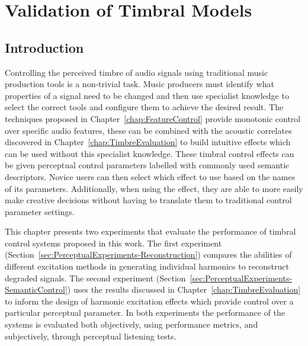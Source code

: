 \chapter{Validation of Timbral Models}
\label{chap:PerceptualExperiments}

\section{Introduction}
\label{sec:PerceptualExperiments-Introduction}
	Controlling the perceived timbre of audio signals using traditional music production tools is a non-trivial task.
	Music producers must identify what properties of a signal need to be changed and then use specialist knowledge to
	select the correct tools and configure them to achieve the desired result. The techniques proposed in
	Chapter~\ref{chap:FeatureControl} provide monotonic control over specific audio features, these can be combined
	with the acoustic correlates discovered in Chapter~\ref{chap:TimbreEvaluation} to build intuitive effects which can
	be used without this specialist knowledge. These timbral control effects can be given perceptual control parameters
	labelled with commonly used semantic descriptors. Novice users can then select which effect to use based on the
	names of its parameters. Additionally, when using the effect, they are able to more easily make creative decisions
	without having to translate them to traditional control parameter settings.

	This chapter presents two experiments that evaluate the performance of timbral control systems proposed in this
	work. The first experiment (Section~\ref{sec:PerceptualExperiments-Reconstruction}) compares the abilities of
	different excitation methods in generating individual harmonics to reconstruct degraded signals. The second
	experiment (Section~\ref{sec:PerceptualExperiments-SemanticControl}) uses the results discussed in
	Chapter~\ref{chap:TimbreEvaluation} to inform the design of harmonic excitation effects which provide control over
	a particular perceptual parameter. In both experiments the performance of the systems is evaluated both
	objectively, using performance metrics, and subjectively, through perceptual listening tests.

